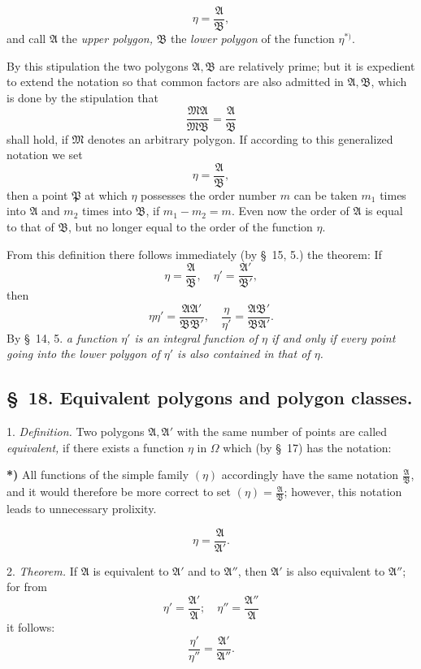 \documentclass{article}
\begin{document}
\[ \eta = \frac{\mathfrak{A}}{\mathfrak{B}}, \]
and call $\mathfrak{A}$ the \emph{upper polygon,} $\mathfrak{B}$ the \emph{lower polygon} of the function $\eta{}^{*)}$.

By this stipulation the two polygons $\mathfrak{A}, \mathfrak{B}$ are relatively prime; but it is expedient to extend the notation so that common factors are also admitted in $\mathfrak{A}, \mathfrak{B}$, which is done by the stipulation that
\[ \frac{\mathfrak{M}\mathfrak{A}}{\mathfrak{M}\mathfrak{B}} = \frac{\mathfrak{A}}{\mathfrak{B}} \]
shall hold, if $\mathfrak{M}$ denotes an arbitrary polygon. If according to this generalized notation we set
\[ \eta = \frac{\mathfrak{A}}{\mathfrak{B}}, \]
then a point $\mathfrak{P}$ at which $\eta$ possesses the order number $m$ can be taken $m_{1}$ times into $\mathfrak{A}$ and $m_{2}$ times into $\mathfrak{B}$, if $m_{1} - m_{2} = m$. Even now the order of $\mathfrak{A}$ is equal to that of $\mathfrak{B}$, but no longer equal to the order of the function $\eta$.

From this definition there follows immediately (by §~15, 5.) the theorem: If
\[ \eta = \frac{\mathfrak{A}}{\mathfrak{B}}, \quad \eta' = \frac{\mathfrak{A}'}{\mathfrak{B}'}, \]
then
\[ \eta\eta' = \frac{\mathfrak{A}\mathfrak{A}'}{\mathfrak{B}\mathfrak{B}'}, \quad \frac{\eta}{\eta'} = \frac{\mathfrak{A}\mathfrak{B}'}{\mathfrak{B}\mathfrak{A}'}. \]
By §~14, 5. \emph{a function $\eta'$ is an integral function of $\eta$ if and only if every point going into the lower polygon of $\eta'$ is also contained in that of $\eta$.}

\subsection*{§~18. Equivalent polygons and polygon classes.}

1. \emph{Definition.} Two polygons $\mathfrak{A}, \mathfrak{A}'$ with the same number of points are called \emph{equivalent,} if there exists a function $\eta$ in $\Omega$ which (by §~17) has the notation:

\textbf{*)} All functions of the simple family $(\eta)$ accordingly have the same notation $\frac{\mathfrak{A}}{\mathfrak{B}}$, and it would therefore be more correct to set $(\eta) = \frac{\mathfrak{A}}{\mathfrak{B}}$; however, this notation leads to unnecessary prolixity.

\[ \eta = \frac{\mathfrak{A}}{\mathfrak{A}'}. \]

2. \emph{Theorem.} If $\mathfrak{A}$ is equivalent to $\mathfrak{A}'$ and to $\mathfrak{A}''$, then $\mathfrak{A}'$ is also equivalent to $\mathfrak{A}''$; for from
\[ \eta' = \frac{\mathfrak{A}'}{\mathfrak{A}}; \quad \eta'' = \frac{\mathfrak{A}''}{\mathfrak{A}} \]
it follows:
\[ \frac{\eta'}{\eta''} = \frac{\mathfrak{A}'}{\mathfrak{A}''}. \]
\end{document}
